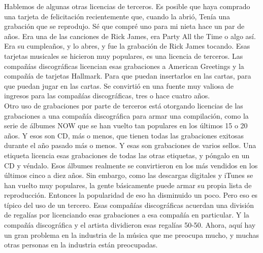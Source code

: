 \documentclass[10pt]{book}
\begin{document}
Hablemos de algunas otras licencias de terceros. Es posible que haya comprado una tarjeta de felicitación recientemente que, cuando la abrió, Tenía una grabación que se reprodujo. Sé que compré uno para mi nieta hace un par de años. Era una de las canciones de Rick James, era Party All the Time o algo así. Era su cumpleaños, y lo abres, y fue la grabación de Rick James tocando. Esas tarjetas musicales se hicieron muy populares, es una licencia de terceros. Las compañías discográficas licencian esas grabaciones a American Greetings y la compañía de tarjetas Hallmark. Para que puedan insertarlos en las cartas, para que puedan jugar en las cartas. Se convirtió en una fuente muy valiosa de ingresos para las compañías discográficas, tres o hace cuatro años.\\
Otro uso de grabaciones por parte de terceros está otorgando licencias de las grabaciones a una compañía discográfica para armar una compilación, como la serie de álbumes NOW que se han vuelto tan populares en los últimos 15 o 20 años. Y esos son CD, más o menos, que tienen todas las grabaciones exitosas durante el año pasado más o menos. Y esas son grabaciones de varios sellos. Una etiqueta licencia esas grabaciones de todas las otras etiquetas, y póngalo en un CD y véndalo. Esos álbumes realmente se convirtieron en los más vendidos en los últimos cinco a diez años. Sin embargo, como las descargas digitales y iTunes se han vuelto muy populares, la gente básicamente puede armar su propia lista de reproducción. Entonces la popularidad de eso ha disminuido un poco. Pero eso es típico del uso de un tercero. Esas compañías discográficas acuerdan una división de regalías por licenciando esas grabaciones a esa compañía en particular. Y la compañía discográfica y el artista dividieron esas regalías 50-50. Ahora, aquí hay un gran problema en la industria de la música que me preocupa mucho, y muchas otras personas en la industria están preocupadas.\\
\end{document}
